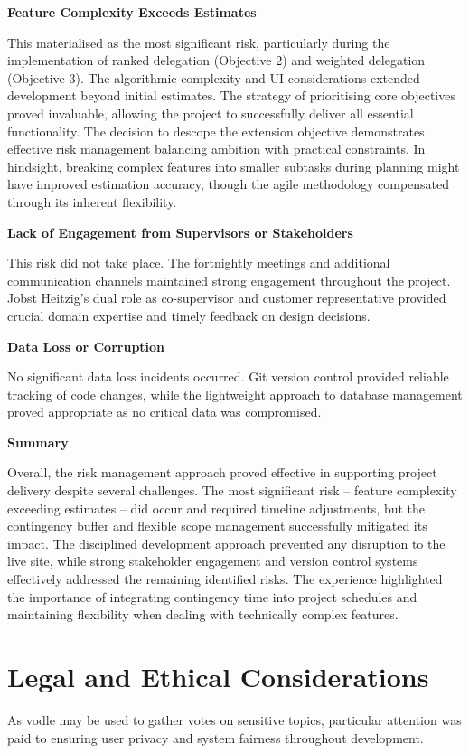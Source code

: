 \textbf{Feature Complexity Exceeds Estimates}

This materialised as the most significant risk, particularly during the implementation of ranked delegation (Objective 2) and weighted delegation (Objective 3). The algorithmic complexity and UI considerations extended development beyond initial estimates.
The strategy of prioritising core objectives proved invaluable, allowing the project to successfully deliver all essential functionality. The decision to descope the extension objective demonstrates effective risk management balancing ambition with practical constraints.
In hindsight, breaking complex features into smaller subtasks during planning might have improved estimation accuracy, though the agile methodology compensated through its inherent flexibility.

\textbf{Lack of Engagement from Supervisors or Stakeholders}

This risk did not take place. The fortnightly meetings and additional communication channels maintained strong engagement throughout the project. Jobst Heitzig's dual role as co-supervisor and customer representative provided crucial domain expertise and timely feedback on design decisions.

\textbf{Data Loss or Corruption}

No significant data loss incidents occurred. Git version control provided reliable tracking of code changes, while the lightweight approach to database management proved appropriate as no critical data was compromised.

\textbf{Summary}

Overall, the risk management approach proved effective in supporting project delivery despite several challenges. The most significant risk -- feature complexity exceeding estimates -- did occur and required timeline adjustments, but the contingency buffer and flexible scope management successfully mitigated its impact. The disciplined development approach prevented any disruption to the live site, while strong stakeholder engagement and version control systems effectively addressed the remaining identified risks. The experience highlighted the importance of integrating contingency time into project schedules and maintaining flexibility when dealing with technically complex features.

\section{Legal and Ethical Considerations}
As vodle may be used to gather votes on sensitive topics, particular attention was paid to ensuring user privacy and system fairness throughout development.


